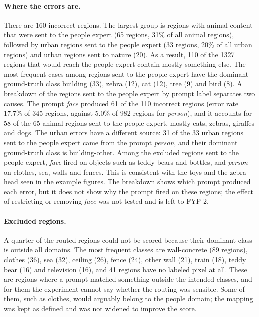 \documentclass{FastFyp}
\begin{document}
\paragraph{Where the errors are.} There are 160 incorrect regions. The largest group is regions with animal content that were sent to the people expert (65 regions, 31\% of all animal regions), followed by urban regions sent to the people expert (33 regions, 20\% of all urban regions) and urban regions sent to nature (20). As a result, 110 of the 1327 regions that would reach the people expert contain mostly something else. The most frequent cases among regions sent to the people expert have the dominant ground-truth class building (33), zebra (12), cat (12), tree (9) and bird (8). A breakdown of the regions sent to the people expert by prompt label separates two causes. The prompt \textit{face} produced 61 of the 110 incorrect regions (error rate 17.7\% of 345 regions, against 5.0\% of 982 regions for \textit{person}), and it accounts for 58 of the 65 animal regions sent to the people expert, mostly cats, zebras, giraffes and dogs. The urban errors have a different source: 31 of the 33 urban regions sent to the people expert came from the prompt \textit{person}, and their dominant ground-truth class is building-other. Among the excluded regions sent to the people expert, \textit{face} fired on objects such as teddy bears and bottles, and \textit{person} on clothes, sea, walls and fences. This is consistent with the toys and the zebra head seen in the example figures. The breakdown shows which prompt produced each error, but it does not show why the prompt fired on these regions; the effect of restricting or removing \textit{face} was not tested and is left to FYP-2.
 
\paragraph{Excluded regions.} A quarter of the routed regions could not be scored because their dominant class is outside all domains. The most frequent classes are wall-concrete (89 regions), clothes (36), sea (32), ceiling (26), fence (24), other wall (21), train (18), teddy bear (16) and television (16), and 41 regions have no labeled pixel at all. These are regions where a prompt matched something outside the intended classes, and for them the experiment cannot say whether the routing was sensible. Some of them, such as clothes, would arguably belong to the people domain; the mapping was kept as defined and was not widened to improve the score.
 
\end{document}
